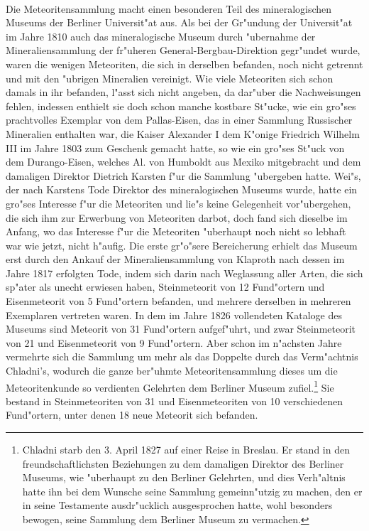 \documentclass[a4paper, 11pt, oneside, german]{article}
\begin{document}
\paragraph{}
Die Meteoritensammlung macht einen besonderen Teil des mineralogischen Museums der Berliner Universit"at aus. Als bei der Gr"undung der Universit"at im Jahre 1810 auch das mineralogische Museum durch "ubernahme der Mineraliensammlung der fr"uheren General-Bergbau-Direktion gegr"undet wurde, waren die wenigen Meteoriten, die sich in derselben befanden, noch nicht getrennt und mit den "ubrigen Mineralien vereinigt. Wie viele Meteoriten sich schon damals in ihr befanden, l"asst sich nicht angeben, da dar"uber die Nachweisungen fehlen, indessen enthielt sie doch schon manche kostbare St"ucke, wie ein gro"ses prachtvolles Exemplar von dem Pallas-Eisen, das in einer Sammlung Russischer Mineralien enthalten war, die Kaiser Alexander I dem K"onige Friedrich Wilhelm III im Jahre 1803 zum Geschenk gemacht hatte, so wie ein gro"ses St"uck von dem Durango-Eisen, welches Al. von Humboldt aus Mexiko mitgebracht und dem damaligen Direktor Dietrich Karsten f"ur die Sammlung "ubergeben hatte. Wei"s, der nach Karstens Tode Direktor des mineralogischen Museums wurde, hatte ein gro"ses Interesse f"ur die Meteoriten und lie"s keine Gelegenheit vor"ubergehen, die sich ihm zur Erwerbung von Meteoriten darbot, doch fand sich dieselbe im Anfang, wo das Interesse f"ur die Meteoriten "uberhaupt noch nicht so lebhaft war wie jetzt, nicht h"aufig. Die erste gr"o"sere Bereicherung erhielt das Museum erst durch den Ankauf der Mineraliensammlung von Klaproth nach dessen im Jahre 1817 erfolgten Tode, indem sich darin nach Weglassung aller Arten, die sich sp"ater als unecht erwiesen haben, Steinmeteorit von 12 Fund"ortern und Eisenmeteorit von 5 Fund"ortern befanden, und mehrere derselben in mehreren Exemplaren vertreten waren. In dem im Jahre 1826 vollendeten Kataloge des Museums sind Meteorit von 31 Fund"ortern aufgef"uhrt, und zwar Steinmeteorit von 21 und Eisenmeteorit von 9 Fund"ortern. Aber schon im n"achsten Jahre vermehrte sich die Sammlung um mehr als das Doppelte durch das Verm"achtnis Chladni's, wodurch die ganze ber"uhmte Meteoritensammlung dieses um die Meteoritenkunde so verdienten Gelehrten dem Berliner Museum zufiel.\footnote{Chladni starb den 3. April 1827 auf einer Reise in Breslau. Er stand in den freundschaftlichsten Beziehungen zu dem damaligen Direktor des Berliner Museums, wie "uberhaupt zu den Berliner Gelehrten, und dies Verh"altnis hatte ihn bei dem Wunsche seine Sammlung gemeinn"utzig zu machen, den er in seine Testamente ausdr"ucklich ausgesprochen hatte, wohl besonders bewogen, seine Sammlung dem Berliner Museum zu vermachen.} Sie bestand in Steinmeteoriten von 31 und Eisenmeteoriten von 10 verschiedenen Fund"ortern, unter denen 18 neue Meteorit sich befanden.
\end{document}
